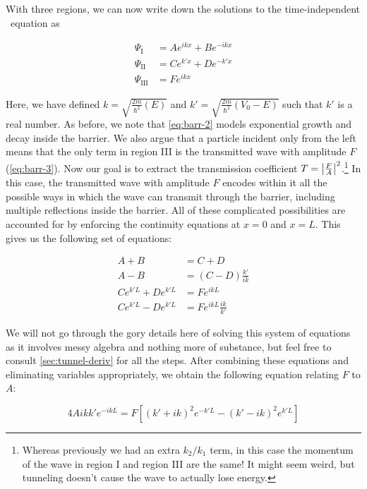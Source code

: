 With three regions, we can now write down the solutions to the time-independent \Sch\ equation as

\begin{align}
	\Psi_{\text{I}} &= Ae^{ikx} + Be^{-ikx} \label{eq:barr-1} \\
	\Psi_{\text{II}} &= Ce^{k'x} + De^{-k'x} \label{eq:barr-2} \\
	\Psi_{\text{III}} &= Fe^{ikx} \label{eq:barr-3}
\end{align}

Here, we have defined $k = \sqrt{\frac{2m}{\hbar^2}(E)}$ and $k' = \sqrt{\frac{2m}{\hbar^2}(V_0 - E)}$ such that $k'$ is a real number. 
As before, we note that \autoref{eq:barr-2} models exponential growth and decay inside the barrier. 
We also argue that a particle incident only from the left means that the only term in region III is the transmitted wave with amplitude $F$ (\autoref{eq:barr-3}). 
Now our goal is to extract the transmission coefficient $T = \abs{\frac{F}{A}}^2$.\footnote{Whereas previously we had an extra $k_2/k_1$ term, in this case the momentum of the wave in region I and region III are the same! It might seem weird, but tunneling doesn't cause the wave to actually lose energy.} 
In this case, the transmitted wave with amplitude $F$ encodes within it all the possible ways in which the wave can transmit through the barrier, including multiple reflections inside the barrier. 
All of these complicated possibilities are accounted for by enforcing the continuity equations at $x = 0$ and $x = L$. 
This gives us the following set of equations:

\begin{align*}
	A + B &= C + D \\
	A - B &= (C - D)\frac{k'}{ik} \\
	Ce^{k'L} + De^{k'L} &= Fe^{ikL} \\
	Ce^{k'L} - De^{k'L} &= Fe^{ikL}\frac{ik}{k'}
\end{align*}

We will not go through the gory details here of solving this system of equations as it involves messy algebra and nothing more of substance, but feel free to consult \autoref{sec:tunnel-deriv} for all the steps. 
After combining these equations and eliminating variables appropriately, we obtain the following equation relating $F$ to $A$:

\begin{equation}
	4Aikk'e^{-ikL} = F \left[(k'+ik)^2e^{-k'L} - (k'-ik)^2e^{k'L}\right] \label{eq:tunnel-fa}
\end{equation}

